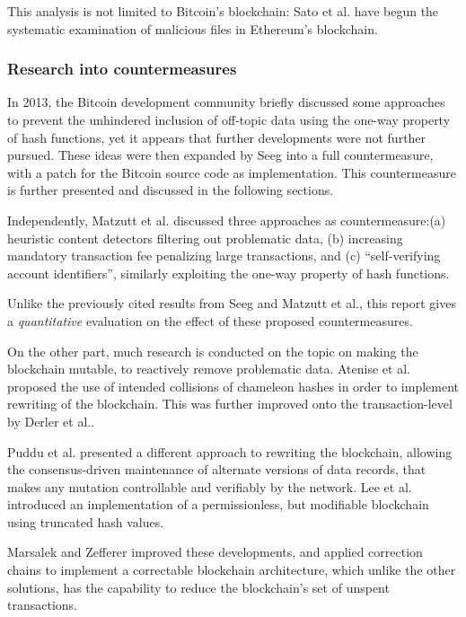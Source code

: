 \documentclass[a4paper,11pt,titlepage]{scrbook}
\begin{document}
This analysis is not limited to Bitcoin's blockchain:\@
Sato et al.\@ \cite{sato_threat_2020} have begun the systematic examination of malicious files in Ethereum's blockchain.


\subsubsection*{Research into countermeasures}

In 2013, the Bitcoin development community briefly discussed some approaches to prevent the unhindered inclusion of off-topic data \cite{maxwell_prevent_2013} using the one-way property of hash functions, yet it appears that further developments were not further pursued.
These ideas were then expanded by Seeg \cite{seeg_hardening_2018} into a full countermeasure, with a patch for the Bitcoin source code as implementation.
This countermeasure is further presented and discussed in the following sections.

Independently, Matzutt et al.\@ \cite{matzutt_thwarting_2018} discussed three approaches as countermeasure:\@ (a) heuristic content detectors filtering out problematic data, (b) increasing mandatory transaction fee penalizing large transactions, and (c) \enquote{self-verifying account identifiers}, similarly exploiting the one-way property of hash functions.

Unlike the previously cited results from Seeg and Matzutt et al., this report gives a \emph{quantitative} evaluation on the effect of these proposed countermeasures.

On the other part, much research is conducted on the topic on making the blockchain mutable, to reactively remove problematic data.
Atenise et al.\@ \cite{ateniese_redactable_2017} proposed the use of intended collisions of chameleon hashes in order to implement rewriting of the blockchain.
This was further improved onto the transaction-level by Derler et al.\@ \cite{derler_fine-grained_2019}.

Puddu et al.\@ \cite{puddu_chain:_2017} presented a different approach to rewriting the blockchain, allowing the consensus-driven maintenance of alternate versions of data records, that makes any mutation controllable and verifiably by the network.
Lee et al.\@ \cite{lee_modifiable_2019} introduced an implementation of a permissionless, but modifiable blockchain using truncated hash values.

Marsalek and Zefferer \cite{marsalek_correctable_2019} improved these developments, and applied correction chains to implement a correctable blockchain architecture, which unlike the other solutions, has the capability to reduce the blockchain's set of unspent transactions.
\end{document}
